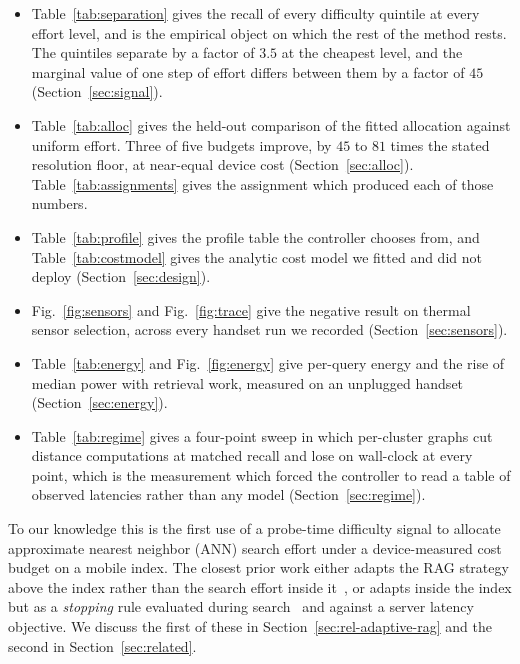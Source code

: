 \documentclass[journal]{IEEEtran}
\begin{document}
\begin{itemize}
\item Table~\ref{tab:separation} gives the recall of every difficulty
quintile at every effort level, and is the empirical object on which the
rest of the method rests. The quintiles separate by a factor of $3.5$ at
the cheapest level, and the marginal value of one step of effort differs
between them by a factor of $45$ (Section~\ref{sec:signal}).
\item Table~\ref{tab:alloc} gives the held-out comparison of the fitted
allocation against uniform effort. Three of five budgets improve, by $45$
to $81$ times the stated resolution floor, at near-equal device cost
(Section~\ref{sec:alloc}). Table~\ref{tab:assignments} gives the
assignment which produced each of those numbers.
\item Table~\ref{tab:profile} gives the profile table the controller
chooses from, and Table~\ref{tab:costmodel} gives the analytic cost model
we fitted and did not deploy (Section~\ref{sec:design}).
\item Fig.~\ref{fig:sensors} and Fig.~\ref{fig:trace} give the negative
result on thermal sensor selection, across every handset run we recorded
(Section~\ref{sec:sensors}).
\item Table~\ref{tab:energy} and Fig.~\ref{fig:energy} give per-query
energy and the rise of median power with retrieval work, measured on an
unplugged handset (Section~\ref{sec:energy}).
\item Table~\ref{tab:regime} gives a four-point sweep in which per-cluster
graphs cut distance computations at matched recall and lose on wall-clock
at every point, which is the measurement which forced the controller to
read a table of observed latencies rather than any model
(Section~\ref{sec:regime}).
\end{itemize}

To our knowledge this is the first use of a probe-time difficulty signal to
allocate approximate nearest neighbor (ANN) search effort under a
device-measured cost budget on a mobile index. The closest prior work either
adapts the RAG strategy above the index rather than the search effort inside
it~\cite{jeong2024adaptiverag}, or adapts inside the index but as a
\emph{stopping} rule evaluated during
search~\cite{li2020earlytermination,chatzakis2026darth} and against a server
latency objective. We discuss the first of these in
Section~\ref{sec:rel-adaptive-rag} and the second in
Section~\ref{sec:related}.
\end{document}
